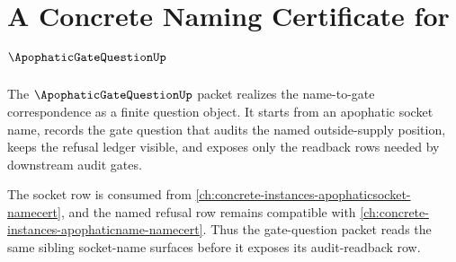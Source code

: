 \chapter{A Concrete Naming Certificate for $\ApophaticGateQuestionUp$}
\label{ch:concrete-instances-apophaticgatequestion-namecert}

The $\ApophaticGateQuestionUp$ packet realizes the name-to-gate correspondence as a finite question object. It starts from an apophatic socket name, records the gate question that audits the named outside-supply position, keeps the refusal ledger visible, and exposes only the readback rows needed by downstream audit gates.

The socket row is consumed from \autoref{ch:concrete-instances-apophaticsocket-namecert}, and the named refusal row remains compatible with \autoref{ch:concrete-instances-apophaticname-namecert}. Thus the gate-question packet reads the same sibling socket-name surfaces before it exposes its audit-readback row.


